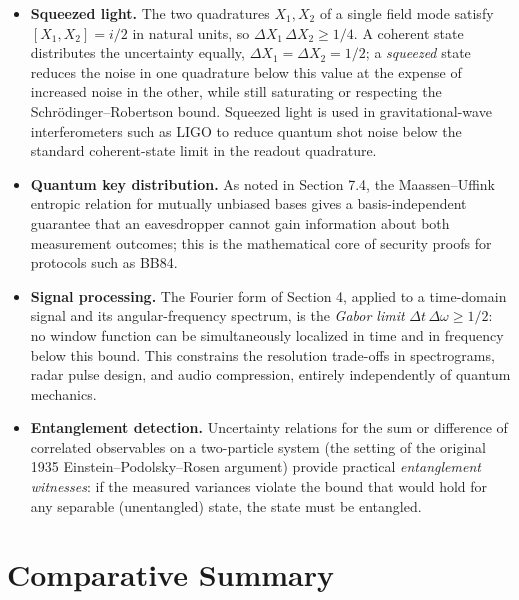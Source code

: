 \documentclass[11pt]{article}
\theoremstyle{plain}
\theoremstyle{definition}
\theoremstyle{remark}
\begin{document}
\begin{itemize}[leftmargin=1.5em]

\item \textbf{Squeezed light.} The two quadratures $X_1,X_2$ of a single field mode satisfy
$[X_1,X_2]=i/2$ in natural units, so $\Delta X_1\,\Delta X_2 \geq 1/4$. A coherent state
distributes the uncertainty equally, $\Delta X_1=\Delta X_2=1/2$; a \emph{squeezed} state reduces
the noise in one quadrature below this value at the expense of increased noise in the other, while
still saturating or respecting the Schr\"odinger--Robertson bound. Squeezed light is used in
gravitational-wave interferometers such as LIGO to reduce quantum shot noise below the
standard coherent-state limit in the readout quadrature.

\item \textbf{Quantum key distribution.} As noted in Section 7.4, the Maassen--Uffink entropic
relation for mutually unbiased bases gives a basis-independent guarantee that an eavesdropper
cannot gain information about both measurement outcomes; this is the mathematical core of security
proofs for protocols such as BB84.

\item \textbf{Signal processing.} The Fourier form of Section 4, applied to a time-domain signal
and its angular-frequency spectrum, is the \emph{Gabor limit}
$\Delta t\, \Delta\omega \geq 1/2$: no window function can be simultaneously localized in time and
in frequency below this bound. This constrains the resolution trade-offs in spectrograms, radar
pulse design, and audio compression, entirely independently of quantum mechanics.

\item \textbf{Entanglement detection.} Uncertainty relations for the sum or difference of
correlated observables on a two-particle system (the setting of the original 1935
Einstein--Podolsky--Rosen argument) provide practical \emph{entanglement witnesses}: if the
measured variances violate the bound that would hold for any separable (unentangled) state, the
state must be entangled.

\end{itemize}

\section{Comparative Summary}
\end{document}
